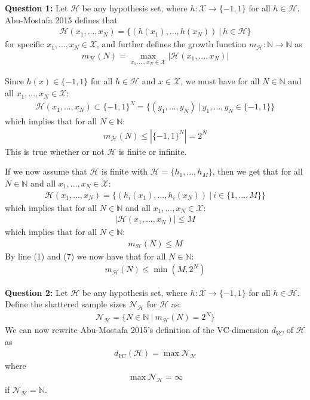 \textbf{Question 1:} Let $\mathcal{H}$ be any hypothesis set, where $h:\mathcal{X}\to \{-1,1\}$ for all $h\in \mathcal{H}$. Abu-Mostafa 2015 defines that
\begin{align}
\mathcal{H}(x_1,...,x_N) = \{(h(x_1),...,h(x_N))\ |\ h\in \mathcal{H}\}
\end{align}
for specific $x_1,...,x_N \in \mathcal{X}$, and further defines the growth function $m_\mathcal{H}:\mathbb{N}\to \mathbb{N}$ as
\begin{align}
m_\mathcal{H}(N) = \max_{x_1,...,x_N \in \mathcal{X}} |\mathcal{H}(x_1,...,x_N)|
\end{align}

Since $h(x)\in\{-1,1 \}$ for all $h\in \mathcal{H}$ and $x\in \mathcal{X}$, we must have for all $N\in \mathbb{N}$ and all $x_1,...,x_N \in \mathcal{X}$:
\begin{align}
\mathcal{H}(x_1,...,x_N) \subset \{-1,1 \}^N = \{(y_1,...,y_N)\ |\ y_1,...,y_N \in \{-1, 1 \} \}
\end{align}
which implies that for all $N\in \mathbb{N}$:
\begin{align}
m_\mathcal{H}(N) \leq |\{-1,1 \}^N | = 2^N 
\end{align}
This is true whether or not $\mathcal{H}$ is finite or infinite. 

If we now assume that $\mathcal{H}$ is finite with $\mathcal{H} = \{h_1,...,h_M\}$, then we get that for all $N\in \mathbb{N}$ and all $x_1,...,x_N \in \mathcal{X}$:
\begin{align}
\mathcal{H}(x_1,...,x_N) = \{(h_i(x_1),...,h_i(x_N))\ |\ i\in \{1,...,M \}\}
\end{align}
which implies that for all $N\in \mathbb{N}$ and all $x_1,...,x_N \in \mathcal{X}$:
\begin{align}
|\mathcal{H}(x_1,...,x_N)| \leq M
\end{align}
which implies that for all $N\in \mathbb{N}$:
\begin{align}
m_\mathcal{H}(N) \leq M 
\end{align}
By line (1) and (7) we now have that for all $N\in \mathbb{N}$:
\begin{align}
m_\mathcal{H}(N) \leq \min (M,2^N)
\end{align}

\textbf{Question 2:} Let $\mathcal{H}$ be any hypothesis set, where $h:\mathcal{X}\to \{-1,1\}$ for all $h\in \mathcal{H}$. Define the shattered sample sizes $\mathcal{N}_\mathcal{H}$ for $\mathcal{H}$ as:
\begin{align}
\mathcal{N}_\mathcal{H} = \{ N\in \mathbb{N}\ |\ m_\mathcal{H}(N) = 2^N \}
\end{align}
We can now rewrite Abu-Mostafa 2015's definition of the VC-dimension $d_{VC}$ of $\mathcal{H}$ as
\begin{align}
d_{VC}(\mathcal{H}) = \max \mathcal{N}_\mathcal{H}
\end{align}
where
\begin{align}
\max \mathcal{N}_\mathcal{H} = \infty
\end{align}
if $\mathcal{N}_\mathcal{H} = \mathbb{N}$.


